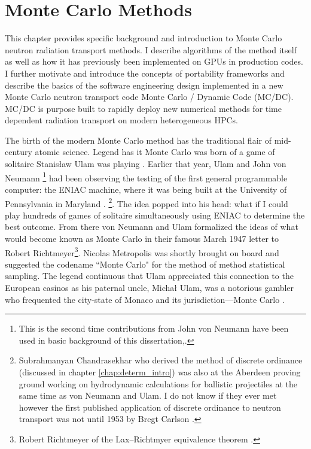 \chapter{Monte Carlo Methods}


\label{chap:mc_methods_intro}


This chapter provides specific background and introduction to Monte Carlo neutron radiation transport methods.
I describe algorithms of the method itself as well as how it has previously been implemented on GPUs in production codes.
I further motivate and introduce the concepts of portability frameworks and describe the basics of the software engineering design implemented in a new Monte Carlo neutron transport code Monte Carlo / Dynamic Code (MC/DC).
MC/DC is purpose built to rapidly deploy new numerical methods for time dependent radiation transport on modern heterogeneous HPCs.

The birth of the modern Monte Carlo method has the traditional flair of mid-century atomic science.
Legend has it Monte Carlo was born of a game of solitaire Stanisław Ulam was playing \cite{metropolis_1987_history}.
Earlier that year, Ulam and John von Neumann
\footnote{
This is the second time contributions from John von Neumann have been used in basic background of this dissertation,.
}
had been observing the testing of the first general programmable computer: the ENIAC machine, where it was being built at the University of Pennsylvania in Maryland \cite{anderson_1986_maniac}.
\footnote{Subrahmanyan Chandrasekhar who derived the method of discrete ordinance (discussed in chapter \ref{chap:determ_intro}) was also at the Aberdeen proving ground working on hydrodynamic calculations for ballistic projectiles at the same time as von Neumann and Ulam. I do not know if they ever met however the first published application of discrete ordinance to neutron transport was not until 1953 by Bregt Carlson \cite{carlson_1955_sn, carlson_1958_sn}.
}.
The idea popped into his head: what if I could play hundreds of games of solitaire simultaneously using ENIAC to determine the best outcome.
From there von Neumann and Ulam formalized the ideas of what would become known as Monte Carlo in their famous March 1947 letter to Robert Richtmeyer\footnote{
Robert Richtmeyer of the Lax–Richtmyer equivalence theorem \cite{Lax_1956_stability}.
}.
Nicolas Metropolis was shortly brought on board and suggested the codename ``Monte Carlo" for the method of method statistical sampling.
The legend continuous that Ulam appreciated this connection to the European casinos as his paternal uncle, Michał Ulam, was a notorious gambler who frequented the city-state of Monaco and its jurisdiction---Monte Carlo \cite{anderson_1986_maniac}.

